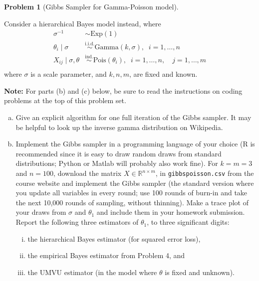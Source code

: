 \documentclass{article}
\newcommand{\RR}{\mathbb{R}}
\newcommand{\simiid}{\overset{\text{i.i.d.}}{\sim}}
\newcommand{\simind}{\overset{\text{ind.}}{\sim}}
\theoremstyle{definition}
\newtheorem{problem}{Problem}
\begin{document}
\begin{problem}[Gibbs Sampler for Gamma-Poisson model]\label{prob:gibbspoisson}

Consider a hierarchical Bayes model instead, where
\begin{align*}
  \sigma^{-1} &\sim \text{Exp}(1)\\
  \theta_i \mid \sigma &\simiid \text{Gamma}(k,\sigma), \;\; i=1,\ldots,n\\
  X_{ij} \mid \sigma, \theta &\simind \text{Pois}(\theta_i), \;\; i=1,\ldots,n, \quad j = 1,\ldots,m\\
\end{align*}
where $\sigma$ is a scale parameter, and $k,n,m$, are fixed and known.

{\bf Note:} For parts (b) and (c) below, be sure to read the instructions on coding problems at the top of this problem set.

\begin{enumerate}[(a)]
\item Give an explicit algorithm for one full iteration of the Gibbs sampler. It may be helpful to look up the inverse gamma distribution on Wikipedia.





\item Implement the Gibbs sampler in a programming language of your choice (R is recommended since it is easy to draw random draws from standard distributions; Python or Matlab will probably also work fine). For $k=m=3$ and $n=100$, download the matrix $X \in \RR^{n \times m}$, in \texttt{gibbspoisson.csv} from the course website and implement the Gibbs sampler (the standard version where you update all variables in every round; use 100 rounds of burn-in and take the next 10,000 rounds of sampling, without thinning). Make a trace plot of your draws from $\sigma$ and $\theta_1$ and include them in your homework submission. Report the following three estimators of $\theta_1$, to three significant digits:
\begin{enumerate}[(i)]
\item the hierarchical Bayes estimator (for squared error loss),
\item the empirical Bayes estimator from Problem 4, and
\item the UMVU estimator (in the model where $\theta$ is fixed and unknown).
\end{enumerate}




\end{enumerate}
\end{problem}
\end{document}
